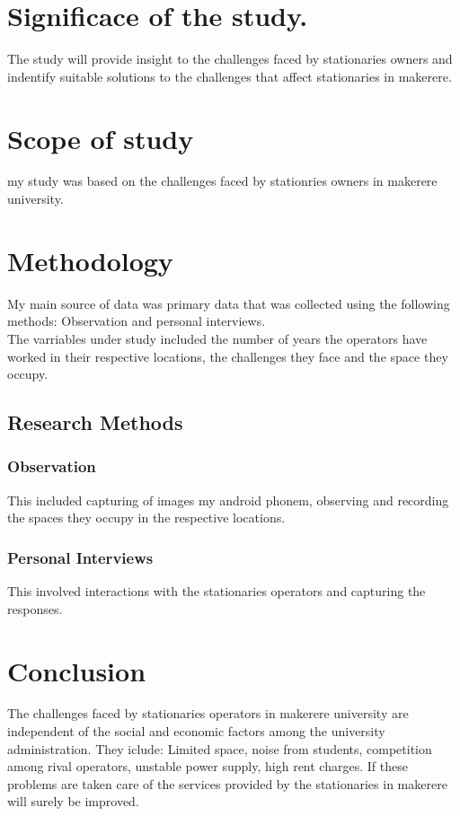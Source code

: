 \documentclass[a4paper,10pt]{article}
\begin{document}
\section{Significace of the study.}
The study will provide insight to the challenges faced by stationaries owners and indentify suitable solutions to the challenges that affect stationaries in makerere.
\section{Scope of study}
my study was based on the challenges faced by stationries owners in makerere university.

\section{Methodology}
My main source of data was primary data that was collected using the following methods: Observation and personal interviews.\\
The varriables under study included the number of years the operators have worked in their respective locations, the challenges they face and the space they occupy.
\subsection{Research Methods}
\subsubsection{Observation}
This included capturing of images my android phonem, observing and recording the spaces they occupy in the respective locations. 
\subsubsection{Personal Interviews}
This involved interactions with the stationaries operators and capturing the responses.
\section{Conclusion}
The challenges faced by stationaries operators in makerere university are independent of the social and economic factors among the university administration. They iclude: Limited space, noise from students, competition among rival operators, unstable power supply, high rent charges. If these problems are taken care of the services provided by the stationaries in makerere will surely be improved. 
\begin{thebibliography}{1}

\end{thebibliography}
\end{document}
